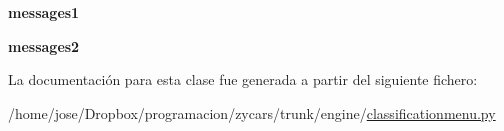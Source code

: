 \begin{DoxyCompactItemize}
\item 
\hypertarget{classengine_1_1classificationmenu_1_1ChampionShipCompleted_aa1c43d16ac9baca584bcd3bca07b6688}{
{\bfseries messages1}}
\label{classengine_1_1classificationmenu_1_1ChampionShipCompleted_aa1c43d16ac9baca584bcd3bca07b6688}

\item 
\hypertarget{classengine_1_1classificationmenu_1_1ChampionShipCompleted_a9965aab6462103a1d86fb2e126e783b4}{
{\bfseries messages2}}
\label{classengine_1_1classificationmenu_1_1ChampionShipCompleted_a9965aab6462103a1d86fb2e126e783b4}

\end{DoxyCompactItemize}


\-La documentación para esta clase fue generada a partir del siguiente fichero\-:\begin{DoxyCompactItemize}
\item 
/home/jose/\-Dropbox/programacion/zycars/trunk/engine/\hyperlink{classificationmenu_8py}{classificationmenu.\-py}\end{DoxyCompactItemize}
